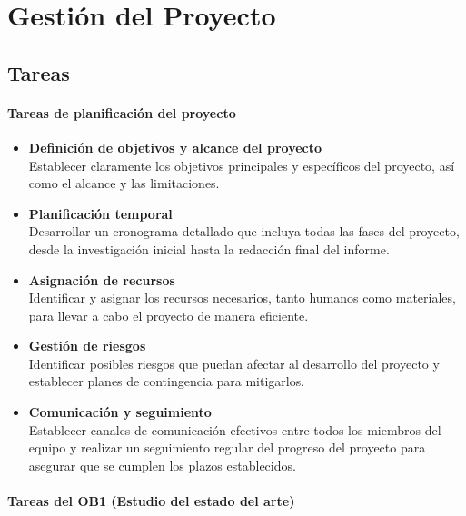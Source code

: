 \chapter{Gestión del Proyecto}\label{cap:gestion_proyecto}

\section{Tareas}\label{sec:tareas}

\subsubsection{Tareas de planificación del proyecto}\label{subsubsec:tareas_organizacion}
\begin{itemize}
    \item \textbf{Definición de objetivos y alcance del proyecto} \\
          Establecer claramente los objetivos principales y específicos del proyecto, así como el alcance y las limitaciones.

    \item \textbf{Planificación temporal} \\
          Desarrollar un cronograma detallado que incluya todas las fases del proyecto, desde la investigación inicial hasta la redacción final del informe.

    \item \textbf{Asignación de recursos} \\
          Identificar y asignar los recursos necesarios, tanto humanos como materiales, para llevar a cabo el proyecto de manera eficiente.

    \item \textbf{Gestión de riesgos} \\
          Identificar posibles riesgos que puedan afectar al desarrollo del proyecto y establecer planes de contingencia para mitigarlos.

    \item \textbf{Comunicación y seguimiento} \\
          Establecer canales de comunicación efectivos entre todos los miembros del equipo y realizar un seguimiento regular del progreso del proyecto para asegurar que se cumplen los plazos establecidos.
\end{itemize}

\subsubsection{Tareas del OB1 (Estudio del estado del arte)}\label{subsubsec:tareas_ob1}

